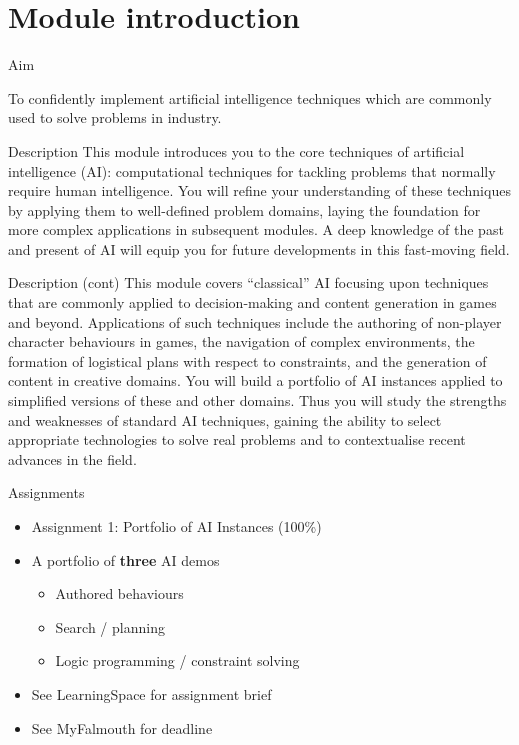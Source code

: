 \part{Module introduction}
\frame{\partpage}

\begin{frame}{Aim}
\begin{center}
To confidently implement artificial intelligence techniques which are commonly used to solve problems in industry.
\end{center}
\end{frame}

\begin{frame}{Description}
This module introduces you to the core techniques of artificial intelligence (AI): computational techniques for tackling problems that normally require human intelligence. You will refine your understanding of these techniques by applying them to well-defined problem domains, laying the foundation for more complex applications in subsequent modules. A deep knowledge of the past and present of AI will equip you for future developments in this fast-moving field.
\end{frame}

\begin{frame}{Description (cont)}
This module covers ``classical'' AI focusing upon techniques that are commonly applied to decision-making and content generation in games and beyond. Applications of such techniques include the authoring of non-player character behaviours in games, the navigation of complex environments, the formation of logistical plans with respect to constraints, and the generation of content in creative domains. You will build a portfolio of AI instances applied to simplified versions of these and other domains. Thus you will study the strengths and weaknesses of standard AI techniques, gaining the ability to select appropriate technologies to solve real problems and to contextualise recent advances in the field.
\end{frame}

\begin{frame}{Assignments}
	\begin{itemize}
		\pause\item Assignment 1: Portfolio of AI Instances (100\%)
		\pause\item A portfolio of \textbf{three} AI demos
		    \begin{itemize}
		        \item Authored behaviours
		        \item Search / planning
		        \item Logic programming / constraint solving
		    \end{itemize}
		\pause\item See LearningSpace for assignment brief
		\pause\item See MyFalmouth for deadline
	\end{itemize}
\end{frame}

